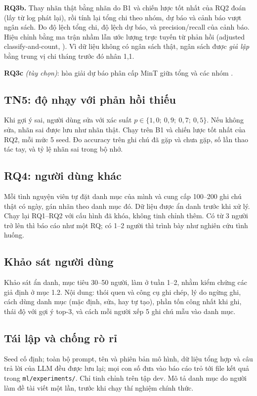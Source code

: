 \documentclass[12pt,a4paper]{article}
\begin{document}
\textbf{RQ3b.} Thay nhãn thật bằng nhãn do B1 và chiến lược tốt nhất của RQ2 đoán (lấy từ log phát lại), rồi tính lại tổng chi theo nhóm, dự báo và cảnh báo vượt ngân sách. Đo độ lệch tổng chi, độ lệch dự báo, và precision/recall của cảnh báo. Hiệu chỉnh bằng ma trận nhầm lẫn ước lượng trực tuyến từ phản hồi (adjusted classify-and-count, \citealp{forman2008quantifying}). Vì dữ liệu không có ngân sách thật, ngân sách được \emph{giả lập} bằng trung vị chi tháng trước đó nhân 1,1.

\textbf{RQ3c} \emph{(tùy chọn)}: hòa giải dự báo phân cấp MinT giữa tổng và các nhóm \citep{wickramasuriya2019mint}.

\subsection{TN5: độ nhạy với phản hồi thiếu}
Khi gợi ý sai, người dùng sửa với xác suất $p \in \{1{,}0;\ 0{,}9;\ 0{,}7;\ 0{,}5\}$. Nếu không sửa, nhãn sai được lưu như nhãn thật. Chạy trên B1 và chiến lược tốt nhất của RQ2, mỗi mức 5 seed. Đo accuracy trên ghi chú đã gặp và chưa gặp, số lần thao tác tay, và tỷ lệ nhãn sai trong bộ nhớ.

\subsection{RQ4: người dùng khác}
Mỗi tình nguyện viên tự đặt danh mục của mình và cung cấp 100--200 ghi chú thật có ngày, gán nhãn theo danh mục đó. Dữ liệu được ẩn danh trước khi xử lý. Chạy lại RQ1--RQ2 với cấu hình đã khóa, không tinh chỉnh thêm. Có từ 3 người trở lên thì báo cáo như một RQ; có 1--2 người thì trình bày như nghiên cứu tình huống.

\subsection{Khảo sát người dùng}\label{sec:khaosat}
Khảo sát ẩn danh, mục tiêu 30--50 người, làm ở tuần 1--2, nhằm kiểm chứng các giả định ở mục 1.2. Nội dung: thói quen và công cụ ghi chép, lý do ngừng ghi, cách dùng danh mục (mặc định, sửa, hay tự tạo), phần tốn công nhất khi ghi, thái độ với gợi ý top-3, và cách mỗi người xếp 5 ghi chú mẫu vào danh mục.

\subsection{Tái lập và chống rò rỉ}
Seed cố định; toàn bộ prompt, tên và phiên bản mô hình, dữ liệu tổng hợp và câu trả lời của LLM đều được lưu lại; mọi con số đưa vào báo cáo trỏ tới file kết quả trong \texttt{ml/experiments/}. Chỉ tinh chỉnh trên tập dev. Mô tả danh mục do người làm đề tài viết một lần, trước khi chạy thí nghiệm chính thức.
\end{document}
